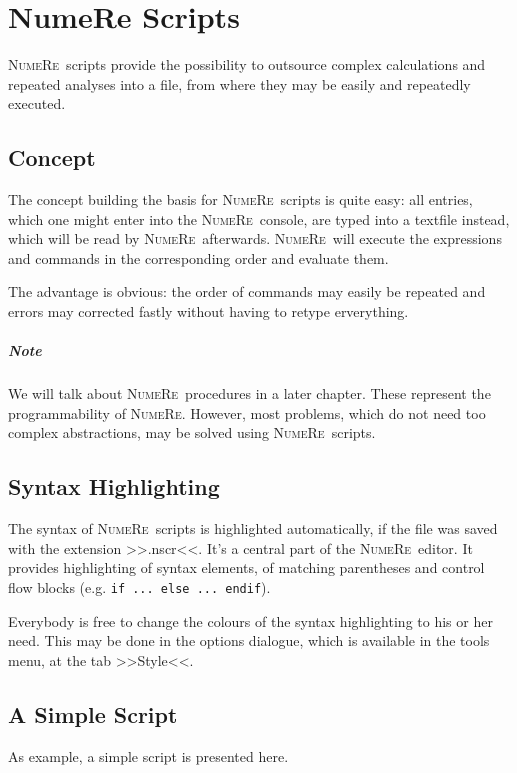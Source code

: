 \documentclass[DIV=14,headsepline,footsepline]{scrbook}
\newcommand{\NR}{\textsc{Nu\-me\-Re}}
\begin{document}
		\chapter{NumeRe Scripts}
			\NR\ scripts provide the possibility to outsource complex calculations and repeated analyses into a file, from where they may be easily and repeatedly executed.
			\section{Concept}
				The concept building the basis for \NR\ scripts is quite easy: all entries, which one might enter into the \NR\ console, are typed into a textfile instead, which will be read by \NR\ afterwards. \NR\ will execute the expressions and commands in the corresponding order and evaluate them.
				
				The advantage is obvious: the order of commands may easily be repeated and errors may corrected fastly without having to retype erverything.
				\paragraph{Note}
					We will talk about \NR\ procedures in a later chapter. These represent the programmability of \NR. However, most problems, which do not need too complex abstractions, may be solved using \NR\ scripts.
				
			\section{Syntax Highlighting}
				The syntax of \NR\ scripts is highlighted automatically, if the file was saved with the extension >>.nscr<<. It's a central part of the \NR\ editor. It provides highlighting of syntax elements, of matching parentheses and control flow blocks (e.g. \verb+if ... else ... endif+).
				
				Everybody is free to change the colours of the syntax highlighting to his or her need. This may be done in the options dialogue, which is available in the tools menu, at the tab >>Style<<. 
			\section{A Simple Script}
				As example, a simple script is presented here.
				
\end{document}

